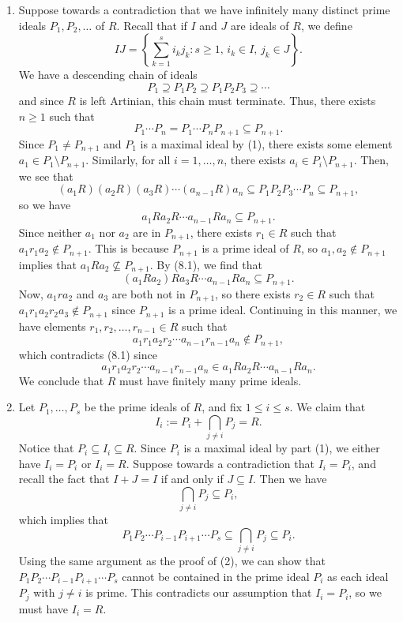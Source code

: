 \documentclass[10pt]{article}
\makeatletter
\numberwithin{equation}{section}
\theoremstyle{newstyle}
\newenvironment{pf}[1][\proofname]{\par
  \pushQED{\qed}%
  \normalfont \topsep0\p@\relax
  \trivlist
  \item[\hskip\labelsep\scshape
  #1\@addpunct{.}]\ignorespaces
}{%
  \popQED\endtrivlist\@endpefalse
}
\makeatother
\begin{document}
\begin{pf}
\begin{enumerate}[(1)]
    \item Suppose towards a contradiction that we have infinitely many distinct prime ideals 
    $P_1, P_2, \dots$ of $R$. Recall that if $I$ and $J$ are ideals of $R$, we define 
    \[ IJ = \left\{\sum_{k=1}^s i_kj_k : s \geq 1,\, i_k \in I,\, j_k \in J\right\}. \]
    We have a descending chain of ideals 
    \[ P_1 \supseteq P_1P_2 \supseteq P_1P_2P_3 \supseteq \cdots \]
    and since $R$ is left Artinian, this chain must terminate. Thus, there exists $n \geq 1$ such that 
    \[ P_1 \cdots P_n = P_1 \cdots P_n P_{n+1} \subseteq P_{n+1}. \]
    Since $P_1 \neq P_{n+1}$ and $P_1$ is a maximal ideal by (1), there exists some element 
    $a_1 \in P_1 \setminus P_{n+1}$. Similarly, for all $i = 1, \dots, n$, there exists 
    $a_i \in P_i \setminus P_{n+1}$. Then, we see that 
    \[ (a_1R)(a_2R)(a_3R) \cdots (a_{n-1}R) a_n \subseteq P_1P_2P_3 \cdots P_n \subseteq P_{n+1}, \]
    so we have 
    \begin{equation}
        a_1Ra_2R \cdots a_{n-1}Ra_n \subseteq P_{n+1}.
    \end{equation} 
    Since neither $a_1$ nor $a_2$ are in $P_{n+1}$, there exists $r_1 \in R$ such that 
    $a_1r_1a_2 \notin P_{n+1}$. This is because $P_{n+1}$ is a prime ideal of $R$, so $a_1, a_2 \notin P_{n+1}$ 
    implies that $a_1 R a_2 \nsubseteq P_{n+1}$. By (8.1), we find that 
    \[ (a_1Ra_2)Ra_3R \cdots a_{n-1}Ra_n \subseteq P_{n+1}. \]
    Now, $a_1ra_2$ and $a_3$ are both not in $P_{n+1}$, so there exists $r_2 \in R$ such that 
    $a_1r_1a_2r_2a_3 \notin P_{n+1}$ since $P_{n+1}$ is a prime ideal. Continuing in this manner, 
    we have elements 
    $r_1, r_2, \dots, r_{n-1} \in R$ such that 
    \[ a_1r_1a_2r_2 \cdots a_{n-1}r_{n-1}a_n \notin P_{n+1}, \]
    which contradicts (8.1) since 
    \[ a_1r_1a_2r_2 \cdots a_{n-1}r_{n-1}a_n \in a_1Ra_2R \cdots a_{n-1}Ra_n. \]
    We conclude that $R$ must have finitely many prime ideals.
    
    \item Let $P_1, \dots, P_s$ be the prime ideals of $R$, and fix $1 \leq i \leq s$. We claim that 
    \[ I_i := P_i + \bigcap_{j\neq i} P_j = R. \]
    Notice that $P_i \subseteq I_i \subseteq R$. Since $P_i$ is a maximal ideal by part (1), we either
    have $I_i = P_i$ or $I_i = R$. Suppose towards a contradiction that $I_i = P_i$, and recall the fact
    that $I + J = I$ if and only if $J \subseteq I$. Then we have 
    \[ \bigcap_{j\neq i} P_j \subseteq P_i, \]
    which implies that 
    \[ P_1P_2 \cdots P_{i-1}P_{i+1} \cdots P_s \subseteq \bigcap_{j\neq i} P_j \subseteq P_i. \]
    Using the same argument as the proof of (2), we can show that $P_1P_2 \cdots P_{i-1}P_{i+1} 
    \cdots P_s$ cannot be contained in the prime ideal $P_i$ as each ideal $P_j$ with $j \neq i$ is 
    prime. This contradicts our assumption that $I_i = P_i$, so we must have 
    $I_i = R$. \qedhere 
\end{enumerate}
\end{pf}
\end{document}
